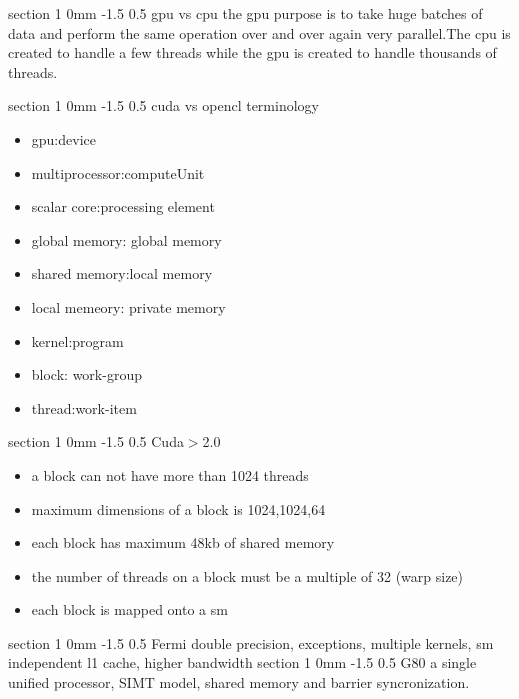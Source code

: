 \documentclass[a4paper,11pt]{article}
\makeatletter
\renewcommand{\section}{\@startsection
   {section}%
   {1}%
   {0mm}%
   {-1.5\baselineskip}%
   {0.5\baselineskip}%
   {\sffamily\bfseries\upshape\normalsize}}%
\makeatother
\begin{document}
\section{gpu vs cpu}
the gpu purpose is to take huge batches of data and perform the same operation over and over again very parallel.The cpu is created to handle a few threads while the gpu is created to handle thousands of threads.

\section{cuda vs opencl terminology}
\begin{itemize}
\item gpu:device
\item multiprocessor:computeUnit
\item scalar core:processing element
\item global memory: global memory
\item shared memory:local memory
\item local memeory: private memory
\item kernel:program
\item block: work-group
\item thread:work-item
\end{itemize}
\section{Cuda$>$2.0}
\begin{itemize}
\item a block can not have more than 1024 threads
\item maximum dimensions of a block is 1024,1024,64
\item each block has maximum 48kb of shared memory
\item the number of threads on a block must be a multiple of 32 (warp size)
\item each block is mapped onto a sm
\end{itemize}
\section{Fermi}
double precision, exceptions, multiple kernels, sm independent l1 cache, higher bandwidth
\section{G80}
a single unified processor, SIMT model, shared memory and barrier syncronization.
\end{document}

